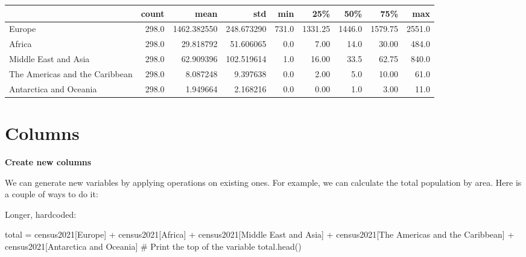 \documentclass[
  letterpaper,
  DIV=11,
  numbers=noendperiod]{scrreprt}
\newenvironment{Shaded}{\begin{snugshade}}{\end{snugshade}}
\newcommand{\CommentTok}[1]{\textcolor[rgb]{0.37,0.37,0.37}{#1}}
\newcommand{\NormalTok}[1]{\textcolor[rgb]{0.00,0.23,0.31}{#1}}
\newcommand{\OperatorTok}[1]{\textcolor[rgb]{0.37,0.37,0.37}{#1}}
\newcommand{\StringTok}[1]{\textcolor[rgb]{0.13,0.47,0.30}{#1}}
\begin{document}
\begin{tabular}{lrrrrrrrr}
\toprule
{} &  count &         mean &         std &    min &      25\% &     50\% &      75\% &     max \\
\midrule
Europe                         &  298.0 &  1462.382550 &  248.673290 &  731.0 &  1331.25 &  1446.0 &  1579.75 &  2551.0 \\
Africa                         &  298.0 &    29.818792 &   51.606065 &    0.0 &     7.00 &    14.0 &    30.00 &   484.0 \\
Middle East and Asia           &  298.0 &    62.909396 &  102.519614 &    1.0 &    16.00 &    33.5 &    62.75 &   840.0 \\
The Americas and the Caribbean &  298.0 &     8.087248 &    9.397638 &    0.0 &     2.00 &     5.0 &    10.00 &    61.0 \\
Antarctica and Oceania         &  298.0 &     1.949664 &    2.168216 &    0.0 &     0.00 &     1.0 &     3.00 &    11.0 \\
\bottomrule
\end{tabular}

\section*{Columns}\label{columns}


\textbf{Create new columns}

We can generate new variables by applying operations on existing ones.
For example, we can calculate the total population by area. Here is a
couple of ways to do it:

Longer, hardcoded:

\begin{Shaded}
\begin{Highlighting}[]
\NormalTok{total }\OperatorTok{=}\NormalTok{ census2021[}\StringTok{\textquotesingle{}Europe\textquotesingle{}}\NormalTok{] }\OperatorTok{+}\NormalTok{ census2021[}\StringTok{\textquotesingle{}Africa\textquotesingle{}}\NormalTok{] }\OperatorTok{+}\NormalTok{ census2021[}\StringTok{\textquotesingle{}Middle East and Asia\textquotesingle{}}\NormalTok{] }\OperatorTok{+}\NormalTok{ census2021[}\StringTok{\textquotesingle{}The Americas and the Caribbean\textquotesingle{}}\NormalTok{] }\OperatorTok{+}\NormalTok{ census2021[}\StringTok{\textquotesingle{}Antarctica and Oceania\textquotesingle{}}\NormalTok{]}
\CommentTok{\# Print the top of the variable}
\NormalTok{total.head()}
\end{Highlighting}
\end{Shaded}
\end{document}
